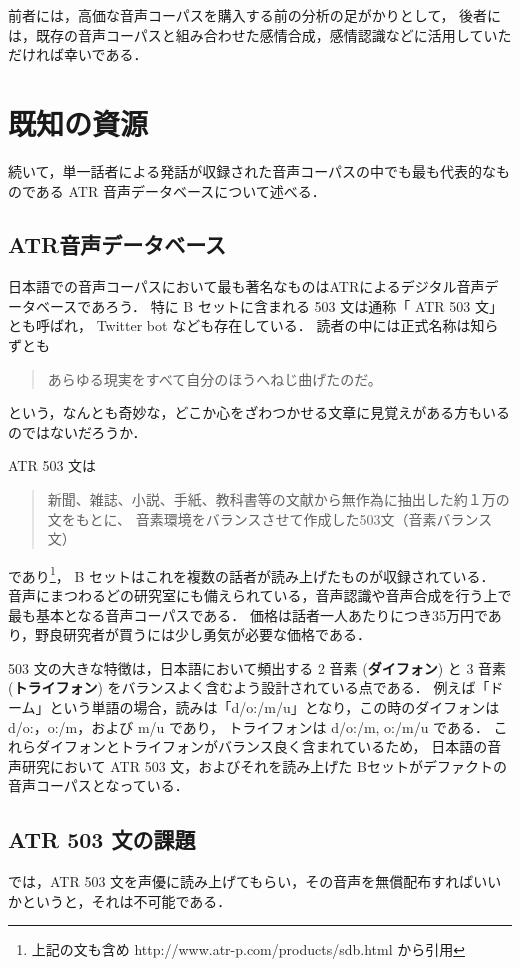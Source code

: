 \documentclass[final,10pt,twocolumn,3p,times,fleqn]{elsarticle}
\begin{document}
 前者には，高価な音声コーパスを購入する前の分析の足がかりとして，
 後者には，既存の音声コーパスと組み合わせた感情合成，感情認識などに活用していただければ幸いである．
 
   \section{既知の資源}
  続いて，単一話者による発話が収録された音声コーパスの中でも最も代表的なものである ATR 音声データベースについて述べる．

  \subsection{ATR音声データベース}
  日本語での音声コーパスにおいて最も著名なものはATRによるデジタル音声データベースであろう．
  特に B セットに含まれる 503 文は通称「 ATR 503 文」とも呼ばれ， Twitter bot なども存在している．
  読者の中には正式名称は知らずとも
  \begin{quote}
   あらゆる現実をすべて自分のほうへねじ曲げたのだ。
  \end{quote}
  という，なんとも奇妙な，どこか心をざわつかせる文章に見覚えがある方もいるのではないだろうか．

  ATR 503 文は
 \begin{quote}
  新聞、雑誌、小説、手紙、教科書等の文献から無作為に抽出した約１万の文をもとに、
  音素環境をバランスさせて作成した503文（音素バランス文）
 \end{quote}
 であり\footnote{上記の文も含め http://www.atr-p.com/products/sdb.html から引用}，
 B セットはこれを複数の話者が読み上げたものが収録されている．
 音声にまつわるどの研究室にも備えられている，音声認識や音声合成を行う上で最も基本となる音声コーパスである．
 価格は話者一人あたりにつき35万円であり，野良研究者が買うには少し勇気が必要な価格である．

  503 文の大きな特徴は，日本語において頻出する 2 音素 (\textbf{ダイフォン}) と
  3 音素 (\textbf{トライフォン}) をバランスよく含むよう設計されている点である．
  例えば「ドーム」という単語の場合，読みは「d/o:/m/u」となり，この時のダイフォンは d/o:，o:/m，および m/u であり，
  トライフォンは d/o:/m, o:/m/u である．
  これらダイフォンとトライフォンがバランス良く含まれているため，
  日本語の音声研究において ATR 503 文，およびそれを読み上げた Bセットがデファクトの音声コーパスとなっている．

  \subsection{ATR 503 文の課題}
  では，ATR 503 文を声優に読み上げてもらい，その音声を無償配布すればいいかというと，それは不可能である．
  
\end{document}
